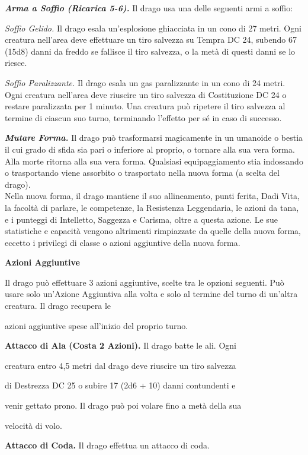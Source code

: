 \begin{multicols}{2}
\emph{\textbf{Arma a Soffio (Ricarica 5-6).}} Il drago usa una delle
seguenti armi a soffio:

\emph{Soffio Gelido.} Il drago esala un'esplosione ghiacciata in un cono
di 27 metri. Ogni creatura nell'area deve effettuare un tiro salvezza su Tempra DC 24, subendo 67 (15d8) danni da freddo se fallisce il
tiro salvezza, o la metà di questi danni se lo riesce.

\emph{Soffio Paralizzante.} Il drago esala un gas paralizzante in un
cono di 24 metri. Ogni creatura nell'area deve riuscire un tiro salvezza
di Costituzione DC 24 o restare paralizzata per 1 minuto. Una creatura
può ripetere il tiro salvezza al termine di ciascun suo turno,
terminando l'effetto per sé in caso di successo.

\emph{\textbf{Mutare Forma.}} Il drago può trasformarsi magicamente in
un umanoide o bestia il cui grado di sfida sia pari o inferiore al proprio,  o tornare alla sua vera forma. Alla morte ritorna alla sua vera forma.  Qualsiasi equipaggiamento stia indossando o trasportando viene  assorbito o trasportato nella nuova forma (a scelta del drago).  \\
Nella nuova forma, il drago mantiene il suo allineamento, punti  ferita, Dadi Vita, la facoltà di parlare, le competenze, la Resistenza  Leggendaria, le azioni da tana, e i punteggi di Intelletto, Saggezza  e Carisma, oltre a questa azione. Le sue statistiche e capacità  vengono altrimenti rimpiazzate da quelle della nuova forma, eccetto i privilegi di classe o azioni aggiuntive della nuova forma.

\textbf{Azioni Aggiuntive}

Il drago può effettuare 3 azioni aggiuntive, scelte tra le opzioni  seguenti. Può usare solo un'Azione Aggiuntiva alla volta e solo  al termine del turno di un'altra creatura. Il drago recupera le

azioni aggiuntive spese all'inizio del proprio turno.

\textbf{Attacco di Ala (Costa 2 Azioni).} Il drago batte le ali. Ogni

creatura entro 4,5 metri dal drago deve riuscire un tiro salvezza

di Destrezza DC 25 o subire 17 (2d6 + 10) danni contundenti e

venir gettato prono. Il drago può poi volare fino a metà della sua

velocità di volo.

\textbf{Attacco di Coda.} Il drago effettua un attacco di coda.


\end{multicols}
